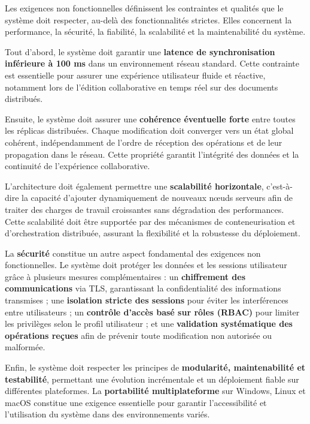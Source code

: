 \documentclass[a4paper,oneside,12pt]{book}
\begin{document}
Les exigences non fonctionnelles définissent les contraintes et qualités que le système doit respecter, au-delà des fonctionnalités strictes. Elles concernent la performance, la sécurité, la fiabilité, la scalabilité et la maintenabilité du système.

Tout d’abord, le système doit garantir une \textbf{latence de synchronisation inférieure à 100 ms} dans un environnement réseau standard. Cette contrainte est essentielle pour assurer une expérience utilisateur fluide et réactive, notamment lors de l’édition collaborative en temps réel sur des documents distribués.

Ensuite, le système doit assurer une \textbf{cohérence éventuelle forte} entre toutes les réplicas distribuées. Chaque modification doit converger vers un état global cohérent, indépendamment de l’ordre de réception des opérations et de leur propagation dans le réseau. Cette propriété garantit l’intégrité des données et la continuité de l’expérience collaborative.

L’architecture doit également permettre une \textbf{scalabilité horizontale}, c’est-à-dire la capacité d’ajouter dynamiquement de nouveaux nœuds serveurs afin de traiter des charges de travail croissantes sans dégradation des performances. Cette scalabilité doit être supportée par des mécanismes de conteneurisation et d’orchestration distribuée, assurant la flexibilité et la robustesse du déploiement.

La \textbf{sécurité} constitue un autre aspect fondamental des exigences non fonctionnelles. Le système doit protéger les données et les sessions utilisateur grâce à plusieurs mesures complémentaires : un \textbf{chiffrement des communications} via TLS, garantissant la confidentialité des informations transmises ; une \textbf{isolation stricte des sessions} pour éviter les interférences entre utilisateurs ; un \textbf{contrôle d’accès basé sur rôles (RBAC)} pour limiter les privilèges selon le profil utilisateur ; et une \textbf{validation systématique des opérations reçues} afin de prévenir toute modification non autorisée ou malformée.

Enfin, le système doit respecter les principes de \textbf{modularité, maintenabilité et testabilité}, permettant une évolution incrémentale et un déploiement fiable sur différentes plateformes. La \textbf{portabilité multiplateforme} sur Windows, Linux et macOS constitue une exigence essentielle pour garantir l’accessibilité et l’utilisation du système dans des environnements variés.
\end{document}

